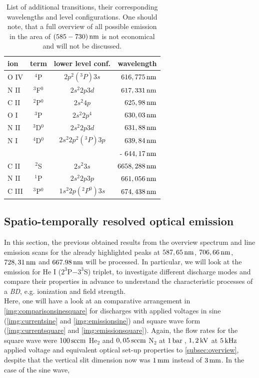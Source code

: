 \documentclass[a4paper,10pt,twoside]{article}
\newcommand{\tilt}[1]{\textit{#1}}
\begin{document}
				\begin{table}
					\centering
					\begin{tabular}{l|c|c|r}
						ion & term & lower level conf. & wavelength \\
						\hline O IV & $^4$P & $2p^2(^3P)3s$ & $\unit[616,775]{nm}$ \\
						\hline N II & $^3$F$^0$ & $2s{^2}2p3d$ & $\unit[617,331]{nm}$ \\
						\hline C II & $^2$P$^0$ & $2s{^2}4p$ & $\unit[625,98]{nm}$ \\
						\hline O I & $^3$P & $2s{^2}2p^4$ & $\unit[630,03]{nm}$ \\
						\hline N II & $^3$D$^0$ & $2s{^2}2p3d$ & $\unit[631,88]{nm}$ \\
						\hline N I & $^4$D$^0$ & $2s{^2}2p^{2}(^3P)3p$ & $\unit[639,84]{nm}$\\
									& 			&					&  - $\unit[644,17]{nm}$ \\
						\hline C II & $^2$S & $2s{^2}3s$ & $\unit[6658,288]{nm}$\\
						\hline N II & $^1$P & $2s{^2}2p3p$ & $\unit[661,056]{nm}$\\
						\hline C III & $^3$P$^0$ & $1s{^2}2p(^2P^0)3s$ & $\unit[674,438]{nm}$\\
					\end{tabular}
					\caption{List of additional transitions, their corresponding wavelengths and level configurations. One should note, that a full overview of all possible emission in the area of $\unit[(585-730)]{nm}$ is not economical and will not be discussed.}
					\label{tab:wavlg}
				\end{table}
		
		\subsection{Spatio-temporally resolved optical emission}\label{subsec:stroe}
		
			In this section, the previous obtained results from the overview spectrum and line emission scans for the already highlighted peaks at $\unit[587,65]{nm}$, $\unit[706,66]{nm}$, $\unit[728,31]{nm}$ and $\unit[667.98]{nm}$ will be processed. In particular, we will look at the emission for He I ($2^3$P$-3^3$S) triplet, to investigate different discharge modes and compare their properties in advance to understand the characteristic processes of a \tilt{BD}, e.g. ionization and field strength.\\
			Here, one will have a look at an comparative arrangement in \autoref{img:comparisonsinesquare} for discharges with applied voltages in sine (\autoref{img:currentsine} and \autoref{img:emissionsine}) and square wave form (\autoref{img:currentsquare} and \autoref{img:emissionsquare}). Again, the flow rates for the square wave were $\unit[100]{sccm}$ He$_2$ and $\unit[0,05]{sccm}$ N$_2$ at $\unit[1]{bar}$\,, $\unit[1,2]{kV}$ at $\unit[5]{kHz}$ applied voltage and equivalent optical set-up properties to \autoref{subsec:overview}, despite that the vertical slit dimension now was $\unit[1]{mm}$ instead of $\unit[3]{mm}$. In the case of the sine wave,
\end{document}
